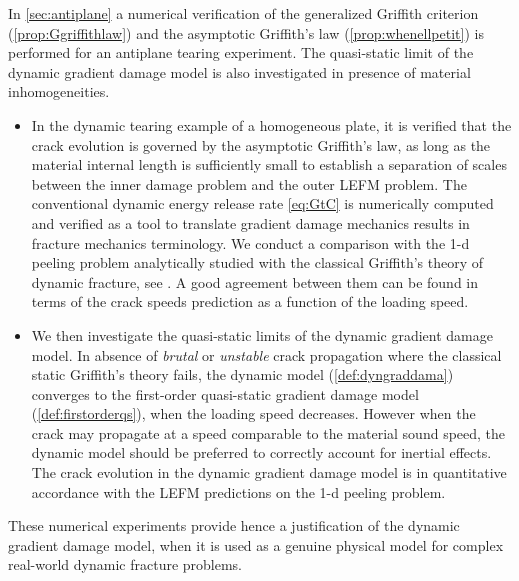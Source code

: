 In \cref{sec:antiplane} a numerical verification of the generalized Griffith criterion (\cref{prop:Ggriffithlaw}) and the asymptotic Griffith's law (\cref{prop:whenellpetit}) is performed for an antiplane tearing experiment. The quasi-static limit of the dynamic gradient damage model is also investigated in presence of material inhomogeneities.
\begin{itemize}
\item In the dynamic tearing example of a homogeneous plate, it is verified that the crack evolution is governed by the asymptotic Griffith's law, as long as the material internal length is sufficiently small to establish a separation of scales between the inner damage problem and the outer LEFM problem. The conventional dynamic energy release rate \eqref{eq:GtC} is numerically computed and verified as a tool to translate gradient damage mechanics results in fracture mechanics terminology. We conduct a comparison with the 1-d peeling problem analytically studied with the classical Griffith's theory of dynamic fracture, see \cite{DumouchelMarigoCharlotte:2008}. A good agreement between them can be found in terms of the crack speeds prediction as a function of the loading speed.

\item We then investigate the quasi-static limits of the dynamic gradient damage model. In absence of \emph{brutal} or \emph{unstable} crack propagation where the classical static Griffith's theory fails, the dynamic model (\cref{def:dyngraddama}) converges to the first-order quasi-static gradient damage model (\cref{def:firstorderqs}), when the loading speed decreases. However when the crack may propagate at a speed comparable to the material sound speed, the dynamic model should be preferred to correctly account for inertial effects. The crack evolution in the dynamic gradient damage model is in quantitative accordance with the LEFM predictions on the 1-d peeling problem.
\end{itemize}

These numerical experiments provide hence a justification of the dynamic gradient damage model, when it is used as a genuine physical model for complex real-world dynamic fracture problems.

